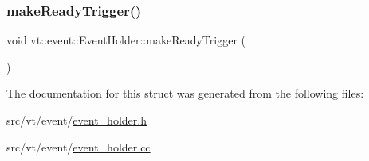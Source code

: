 \subsubsection{\texorpdfstring{make\+Ready\+Trigger()}{makeReadyTrigger()}}
{\footnotesize\ttfamily void vt\+::event\+::\+Event\+Holder\+::make\+Ready\+Trigger (\begin{DoxyParamCaption}{ }\end{DoxyParamCaption})}



The documentation for this struct was generated from the following files\+:\begin{DoxyCompactItemize}
\item 
src/vt/event/\hyperlink{event__holder_8h}{event\+\_\+holder.\+h}\item 
src/vt/event/\hyperlink{event__holder_8cc}{event\+\_\+holder.\+cc}\end{DoxyCompactItemize}
